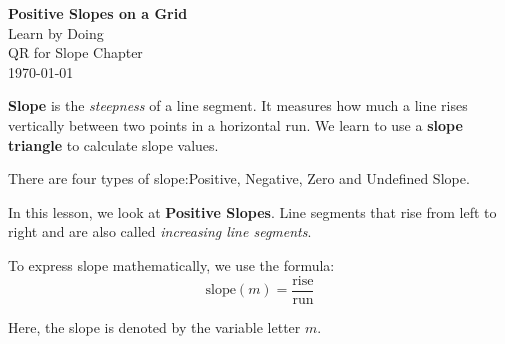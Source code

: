 \documentclass[12pt, a4paper, addpoints]{exam}
\begin{document}





\pgfmathsetseed{\number\pdfrandomseed}


\begin{minipage}[t]{0.2\textwidth} 
\end{minipage}
\begin{minipage}[t]{.5\textwidth} 
\vspace{-16mm}
{\huge 
   {\LARGE\textbf{Positive Slopes on a Grid
}\\
   Learn by Doing \\
QR for Slope Chapter \\
   \today}
   }  
\end{minipage}
\begin{minipage}[t]{0.3\textwidth} 
\end{minipage}
\begin{mdframed}[backgroundcolor=gray!20] %
 \textbf{Slope} is the \textit{steepness} of a line segment. It measures how much a line rises vertically between two points in a horizontal run. We learn to use a \textbf{slope triangle}  to calculate slope values.

There are four types of slope:Positive,  Negative, Zero and Undefined Slope.


In this lesson, we look at \textbf{Positive Slopes}.  Line segments that rise from left to right and are also called  \textit{increasing line segments}. 

To express slope mathematically, we use the formula:
\[ \text{slope} (m) = \frac{\text{rise}}{\text{run}} \]

Here, the slope is denoted by the variable letter \(m\).
\end{mdframed}
\end{document}
